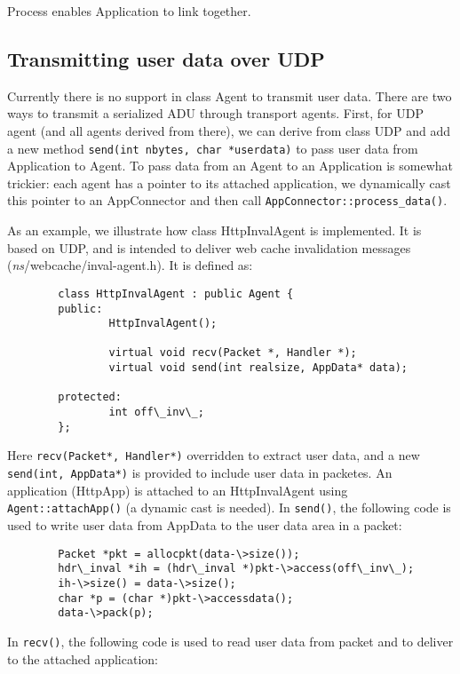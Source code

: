 Process enables Application to link together. 

\subsection{Transmitting user data over UDP}

Currently there is no support in class Agent to transmit user
data. There are two ways to transmit a serialized ADU through transport
agents. First, for UDP agent (and all agents derived from there), we
can derive from class UDP and add a new method
{\tt send(int nbytes, char *userdata)} to pass user data from
Application to Agent. To pass data from an Agent to an Application is
somewhat trickier: each agent has a pointer to its attached
application, we dynamically cast this pointer to an AppConnector and
then call {\tt AppConnector::process\_data()}.

As an example, we illustrate how class HttpInvalAgent is
implemented. It is based on UDP, and is intended to deliver web cache
invalidation messages (\emph{ns}/webcache/inval-agent.h). It is defined as:

\begin{verbatim}
        class HttpInvalAgent : public Agent {
        public: 
                HttpInvalAgent();

                virtual void recv(Packet *, Handler *);
                virtual void send(int realsize, AppData* data);

        protected:
                int off\_inv\_;
        };
\end{verbatim}

Here {\tt recv(Packet*, Handler*)} overridden to extract user data,
and a new {\tt send(int, AppData*)} is provided to include user data
in packetes. An application (HttpApp) is attached to an HttpInvalAgent
using {\tt Agent::attachApp()} (a dynamic cast is needed). In
{\tt send()}, the following code is used to write user data from
AppData to the user data area in a packet:

\begin{verbatim}
        Packet *pkt = allocpkt(data-\>size());
        hdr\_inval *ih = (hdr\_inval *)pkt-\>access(off\_inv\_);
        ih-\>size() = data-\>size();
        char *p = (char *)pkt-\>accessdata();
        data-\>pack(p);
\end{verbatim}

In {\tt recv()}, the following code is used to read user data from
packet and to deliver to the attached application:

